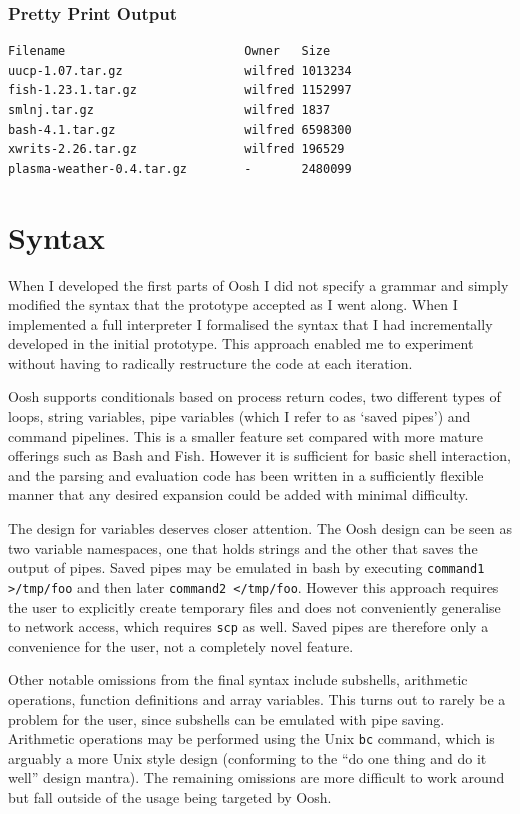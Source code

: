 \documentclass[12pt,twoside,notitlepage]{report}
\begin{document}
\subsubsection{Pretty Print Output}
\begin{verbatim}
Filename                         Owner   Size      
uucp-1.07.tar.gz                 wilfred 1013234   
fish-1.23.1.tar.gz               wilfred 1152997   
smlnj.tar.gz                     wilfred 1837      
bash-4.1.tar.gz                  wilfred 6598300   
xwrits-2.26.tar.gz               wilfred 196529    
plasma-weather-0.4.tar.gz        -       2480099
\end{verbatim}

\section{Syntax}
When I developed the first parts of Oosh I did not specify a grammar and simply
modified the syntax that the prototype accepted as I went along. When I
implemented a full interpreter I formalised the syntax that I had
incrementally developed in the initial prototype. This
approach enabled me to experiment without having to radically restructure the
code at each iteration.

Oosh supports conditionals based on process return codes, two
different types of loops, string variables, pipe variables (which I
refer to as `saved pipes') and command pipelines. This is a smaller
feature set compared with more mature offerings such as Bash and
Fish. However it is sufficient for basic shell interaction, and the
parsing and evaluation code has been written in a sufficiently
flexible manner that any desired expansion could be added with minimal
difficulty.

The design for variables deserves closer attention. The Oosh design
can be seen as two variable namespaces, one that holds strings and the
other that saves the output of pipes. Saved pipes may be emulated in
bash by executing {\tt command1 >/tmp/foo} and then later {\tt command2
  </tmp/foo}. However this approach requires the user to explicitly
create temporary files and does not conveniently generalise to network
access, which requires {\tt scp} as well. Saved pipes are therefore
only a convenience for the user, not a completely novel feature.

Other notable omissions from the final syntax include subshells,
arithmetic operations, function definitions and array variables. This
turns out to rarely be a problem for the user, since subshells can be
emulated with pipe saving. Arithmetic operations may be performed
using the Unix {\tt bc} command, which is arguably a more Unix style
design (conforming to the ``do one thing and do it well'' design
mantra). The remaining omissions are more difficult to work around but
fall outside of the usage being targeted by Oosh.
\end{document}
